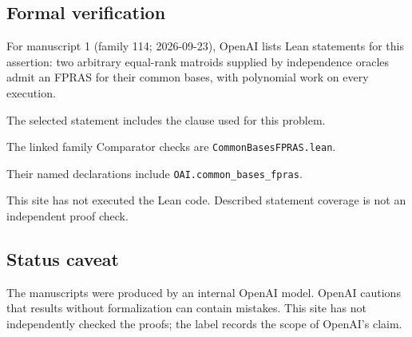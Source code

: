 \documentclass[11pt]{article}
\begin{document}
\subsection{Formal verification}
For manuscript 1 (family 114; 2026-09-23), OpenAI lists Lean statements for this assertion: two arbitrary equal-rank matroids supplied by independence oracles admit an FPRAS for their common bases, with polynomial work on every execution.

The selected statement includes the clause used for this problem.

The linked family Comparator checks are \texttt{CommonBasesFPRAS.lean}.

Their named declarations include \texttt{OAI.common\_bases\_fpras}.

This site has not executed the Lean code. Described statement coverage is not an independent proof check.

\subsection{Status caveat}
The manuscripts were produced by an internal OpenAI model. OpenAI cautions that results without formalization can contain mistakes. This site has not independently checked the proofs; the label records the scope of OpenAI's claim.
\end{document}
